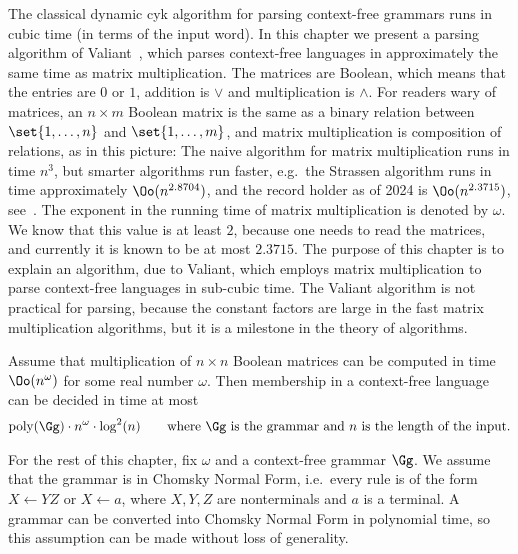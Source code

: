 The classical dynamic {\sc cyk} algorithm for parsing context-free grammars runs in cubic time (in terms of the input word). 
In this chapter we present a parsing algorithm of  Valiant~\cite{Valiant:1975bn}, which parses  context-free languages  in approximately the same time as matrix multiplication.  The matrices are  Boolean, which means that the entries are $0$ or $1$, addition  is $\lor$ and multiplication is $\land$. For readers wary of matrices, an $n \times m$ Boolean matrix is the same as a binary relation between $\set{1,\ldots,n}$ and $\set{1,\ldots,m}$, and matrix multiplication is composition of relations, as in  this picture:
The naive algorithm for matrix multiplication runs in time $n^3$, but smarter algorithms run faster, e.g.~the Strassen algorithm runs in time approximately $\Oo(n^{2.8704})$, and the record holder as of  2024 is $\Oo(n^{2.3715})$, see~\cite{williams2024new}. The exponent in the running time of matrix multiplication is denoted by $\omega$. We know that this value is at least $2$, because one needs to read the matrices, and currently it is known to be at most $2.3715$.  The purpose of this chapter is to explain an algorithm, due to Valiant, which employs matrix multiplication to parse context-free languages in sub-cubic time.  The Valiant algorithm is not practical for parsing, because the constant factors are large in the fast matrix multiplication algorithms, but it is a milestone in the theory of algorithms.

\begin{theorem}
	\label{thm:valiant}
	Assume that  multiplication of $n \times n$ Boolean matrices can be computed in time $\Oo(n^\omega)$ for some real number $\omega$. Then membership in a context-free language can be decided in time at most
	\begin{align*}
\mathrm{poly}(\Gg) \cdot n^\omega \cdot \log^2(n) \qquad \text{where $\Gg$ is the grammar and $n$ is the length of the input.}\end{align*}
\end{theorem}

For the rest of this chapter, fix $\omega$ and a context-free grammar $\Gg$. We assume that the grammar is in Chomsky Normal Form, i.e.~every rule is of the form $X \leftarrow YZ$ or $X \leftarrow a$, where $X,Y,Z$ are nonterminals and $a$ is a terminal. A grammar can be converted into Chomsky Normal Form in polynomial time, so this assumption can be made without loss of generality. 
\newcommand{\ptrip}[3]{#1 \stackrel {#2} \to #3}

